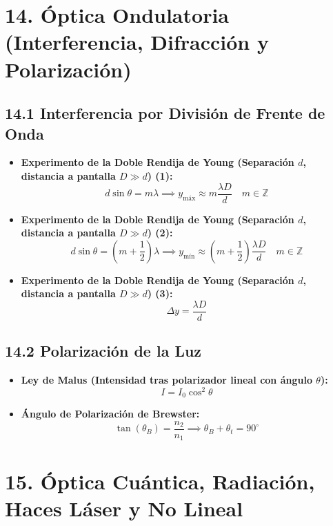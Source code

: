 \documentclass[11pt,a4paper]{article}
\begin{document}
\section*{14. Óptica Ondulatoria (Interferencia, Difracción y Polarización)}

\subsection*{14.1 Interferencia por División de Frente de Onda}

\begin{itemize}
  \item \textbf{Experimento de la Doble Rendija de Young (Separación $d$, distancia a pantalla $D \gg d$) (1):}
  \[
    d \sin\theta = m \lambda \implies y_{\mathrm{máx}} \approx m \frac{\lambda D}{d} \quad m \in \mathbb{Z}
  \]
  \item \textbf{Experimento de la Doble Rendija de Young (Separación $d$, distancia a pantalla $D \gg d$) (2):}
  \[
    d \sin\theta = \left( m + \frac{1}{2} \right)\lambda \implies y_{\mathrm{mín}} \approx \left( m + \frac{1}{2} \right)\frac{\lambda D}{d} \quad m \in \mathbb{Z}
  \]
  \item \textbf{Experimento de la Doble Rendija de Young (Separación $d$, distancia a pantalla $D \gg d$) (3):}
  \[
    \Delta y = \frac{\lambda D}{d}
  \]
\end{itemize}

\subsection*{14.2 Polarización de la Luz}

\begin{itemize}
  \item \textbf{Ley de Malus (Intensidad tras polarizador lineal con ángulo $\theta$):}
  \[
    I = I_0 \cos^2\theta
  \]
  \item \textbf{Ángulo de Polarización de Brewster:}
  \[
    \tan(\theta_B) = \frac{n_2}{n_1} \implies \theta_B + \theta_t = 90^\circ
  \]
\end{itemize}

\section*{15. Óptica Cuántica, Radiación, Haces Láser y No Lineal}
\end{document}
